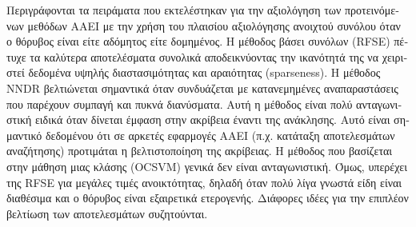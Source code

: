 \documentclass[
    12pt, %
    singlespacing, %
    liststotoc, %
    headsepline, %
]{DoctoralThesis} %
\begin{document}
\begin{abstractGR}
\begin{greek}
Περιγράφονται τα πειράματα που εκτελέστηκαν για την αξιολόγηση των προτεινόμενων μεθόδων ΑΑΕΙ με την χρήση του πλαισίου αξιολόγησης ανοιχτού συνόλου όταν ο θόρυβος είναι είτε αδόμητος είτε δομημένος. Η μέθοδος βάσει συνόλων (RFSE) πέτυχε τα καλύτερα αποτελέσματα συνολικά αποδεικνύοντας την ικανότητά της να χειριστεί δεδομένα υψηλής διαστασιμότητας και αραιότητας (sparseness). Η μέθοδος NNDR βελτιώνεται σημαντικά όταν συνδυάζεται με κατανεμημένες αναπαραστάσεις που παρέχουν συμπαγή και πυκνά διανύσματα. Αυτή η μέθοδος είναι πολύ ανταγωνιστική ειδικά όταν δίνεται έμφαση στην ακρίβεια έναντι της ανάκλησης. Αυτό είναι σημαντικό δεδομένου ότι σε αρκετές εφαρμογές ΑΑΕΙ (π.χ. κατάταξη αποτελεσμάτων αναζήτησης) προτιμάται η βελτιστοποίηση της ακρίβειας. Η μέθοδος που βασίζεται στην μάθηση μιας κλάσης (OCSVM) γενικά δεν είναι ανταγωνιστική. Όμως, υπερέχει της RFSE για μεγάλες τιμές ανοικτότητας, δηλαδή όταν πολύ λίγα γνωστά είδη είναι διαθέσιμα και ο θόρυβος είναι εξαιρετικά ετερογενής. Διάφορες ιδέες για την επιπλέον βελτίωση των αποτελεσμάτων συζητούνται.
\end{greek}

\end{abstractGR}


\tableofcontents %
\listoffigures %
\listoftables %


\mainmatter %
\pagestyle{thesis} %













\printbibliography[heading=bibintoc]
\end{document}
